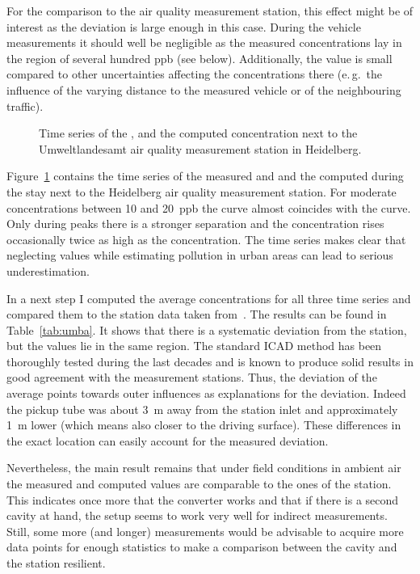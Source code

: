For the comparison to the air quality measurement station, this effect
might be of interest as the deviation is large enough in this
case. During the vehicle measurements it should well be negligible as
the measured concentrations lay in the region of several hundred
\si{ppb} (see below). Additionally, the value is small compared to
other uncertainties affecting the concentrations there (e.\,g.\ the
influence of the varying distance to the measured vehicle or of the
neighbouring traffic).

\begin{figure}[htbp]
  \centering
  
  \caption{Time series of the ,  and the computed
     concentration next to the Umweltlandesamt air quality
    measurement station in Heidelberg.}
  \label{fig:umba}
\end{figure}

Figure~\ref{fig:umba} contains the time series of the measured
 and  and the computed  during the stay next
to the Heidelberg air quality measurement station. For moderate
 concentrations between \num{10} and \SI{20}{ppb} the
 curve almost coincides with the  curve. Only during
peaks there is a stronger separation and the  concentration
rises occasionally twice as high as the  concentration. The
time series makes clear that neglecting  values while
estimating  pollution in urban areas can lead to serious
underestimation.

In a next step I computed the average concentrations for all three
time series and compared them to the station data taken
from~\cite{umba}. The results can be found in Table~\ref{tab:umba}. It
shows that there is a systematic deviation from the station, but the
values lie in the same region. The standard ICAD method has been
thoroughly tested during the last decades and is known to produce
solid results in good agreement with the measurement stations. Thus,
the deviation of the  average points towards outer influences
as explanations for the deviation. Indeed the pickup tube was about
\SI{3}{\meter} away from the station inlet and approximately
\SI{1}{\meter} lower (which means also closer to the driving
surface). These differences in the exact location can easily account
for the measured deviation.

Nevertheless, the main result remains that under field conditions in
ambient air the measured  and computed 
values are comparable to the ones of the station. This indicates once
more that the converter works and that if there is a second cavity at
hand, the setup seems to work very well for indirect 
measurements. Still, some more (and longer) measurements would be
advisable to acquire more data points for enough statistics to make a
comparison between the cavity and the station resilient.


